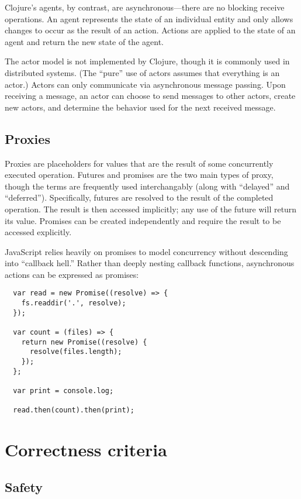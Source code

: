 \documentclass{sig-alternate}
\begin{document}
Clojure's agents, by contrast, are asynchronous---there are no blocking receive operations. An agent represents the state of an individual entity and only allows changes to occur as the result of an action. Actions are applied to the state of an agent and return the new state of the agent.

The actor model is not implemented by Clojure, though it is commonly used in distributed systems. (The ``pure'' use of actors assumes that everything is an actor.) Actors can only communicate via asynchronous message passing. Upon receiving a message, an actor can choose to send messages to other actors, create new actors, and determine the behavior used for the next received message.

\subsection{Proxies}

Proxies are placeholders for values that are the result of some concurrently executed operation. Futures and promises are the two main types of proxy, though the terms are frequently used interchangably (along with ``delayed'' and ``deferred''). Specifically, futures are resolved to the result of the completed operation. The result is then accessed implicitly; any use of the future will return its value. Promises can be created independently and require the result to be accessed explicitly.

JavaScript relies heavily on promises to model concurrency without descending into ``callback hell.'' Rather than deeply nesting callback functions, asynchronous actions can be expressed as promises:

\begin{lstlisting}
  var read = new Promise((resolve) => {
    fs.readdir('.', resolve);
  });

  var count = (files) => {
    return new Promise((resolve) {
      resolve(files.length);
    });
  };

  var print = console.log;

  read.then(count).then(print);
\end{lstlisting}

\section{Correctness criteria}

\subsection{Safety}
\end{document}
